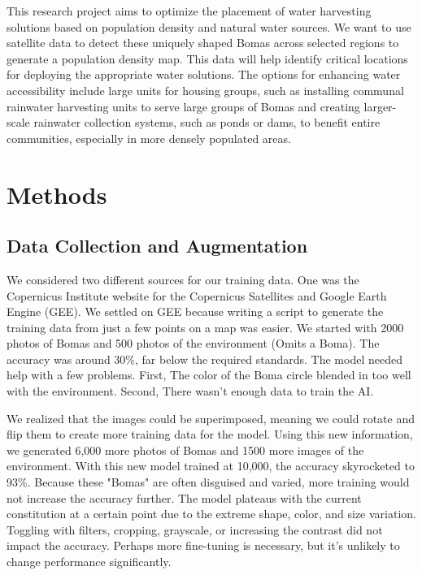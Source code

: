 \documentclass[10pt]{article}
\begin{document}
This research project aims to optimize the placement of water harvesting solutions based on population density and natural water sources. We want to use satellite data to detect these uniquely shaped Bomas across selected regions to generate a population density map. This data will help identify critical locations for deploying the appropriate water solutions. The options for enhancing water accessibility include large units for housing groups, such as installing communal rainwater harvesting units to serve large groups of Bomas and creating larger-scale rainwater collection systems, such as ponds or dams, to benefit entire communities, especially in more densely populated areas.


\section{Methods}
\label{methods}

\subsection{Data Collection and Augmentation}
\label{data}

We considered two different sources for our training data. One was the Copernicus Institute website for the Copernicus Satellites and Google Earth Engine (GEE). We settled on GEE because writing a script to generate the training data from just a few points on a map was easier. We started with 2000 photos of Bomas and 500 photos of the environment (Omits a Boma). The accuracy was around 30\%, far below the required standards. The model needed help with a few problems. First, The color of the Boma circle blended in too well with the environment. Second, There wasn’t enough data to train the AI.

We realized that the images could be superimposed, meaning we could rotate and flip them to create more training data for the model. Using this new information, we generated 6,000 more photos of Bomas and 1500 more images of the environment. With this new model trained at 10,000, the accuracy skyrocketed to 93\%. Because these "Bomas" are often disguised and varied, more training would not increase the accuracy further. The model plateaus with the current constitution at a certain point due to the extreme shape, color, and size variation. Toggling with filters, cropping, grayscale, or increasing the contrast did not impact the accuracy. Perhaps more fine-tuning is necessary, but it's unlikely to change performance significantly.
\end{document}
